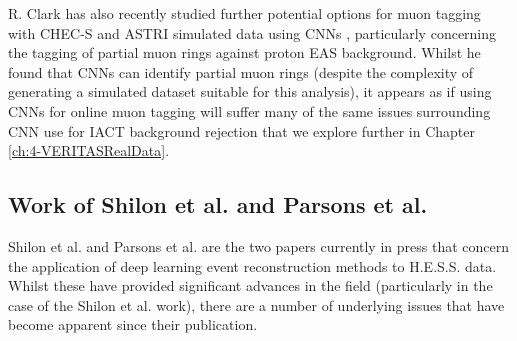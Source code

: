 R. Clark has also recently studied further potential options for muon tagging with CHEC-S and ASTRI simulated data using CNNs \cite{roganthesis}, particularly concerning the tagging of partial muon rings against proton EAS background. Whilst he found that CNNs can identify partial muon rings (despite the complexity of generating a simulated dataset suitable for this analysis), it appears as if using CNNs for online muon tagging will suffer many of the same issues surrounding CNN use for IACT background rejection that we explore further in Chapter \ref{ch:4-VERITASRealData}.

\subsection{Work of Shilon et al. and Parsons et al.}
Shilon et al. \cite{Shilon} and Parsons et al. \cite{ParsonsOhm} are the two papers currently in press that concern the application of deep learning event reconstruction methods to H.E.S.S. data. Whilst these have provided significant advances in the field (particularly in the case of the Shilon et al. work), there are a number of underlying issues that have become apparent since their publication.

